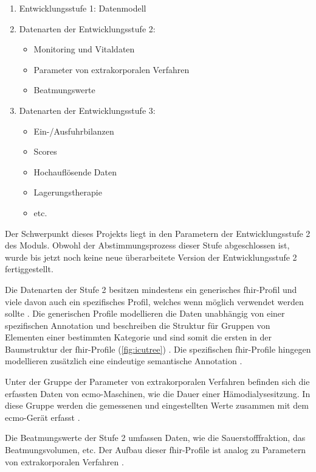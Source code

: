 \begin{enumerate}
	\item Entwicklungsstufe 1: Datenmodell
	\item Datenarten der Entwicklungsstufe 2:
	\begin{itemize}
		\item Monitoring und Vitaldaten
		\item Parameter von extrakorporalen Verfahren
		\item Beatmungswerte
	\end{itemize}
	\item Datenarten der Entwicklungsstufe 3:
	\begin{itemize}
		\item Ein-/Ausfuhrbilanzen
		\item Scores
		\item Hochauflösende Daten
		\item Lagerungstherapie
		\item etc.
	\end{itemize}
\end{enumerate}

 Der Schwerpunkt dieses Projekts liegt in den Parametern der Entwicklungsstufe 2 des Moduls. Obwohl der Abstimmungsprozess dieser Stufe abgeschlossen ist, wurde bis jetzt noch keine neue überarbeitete Version der Entwicklungsstufe 2 fertiggestellt.

 Die Datenarten der Stufe 2 besitzen mindestens ein generisches \ac{fhir}-Profil und viele davon auch ein spezifisches Profil, welches wenn möglich verwendet werden sollte \cite{icukdz, modicuvid}. Die generischen Profile modellieren die Daten unabhängig von einer spezifischen Annotation und beschreiben die Struktur für Gruppen von Elementen einer bestimmten Kategorie und sind somit die ersten in der Baumstruktur der \ac{fhir}-Profile (\ref{fig:icutree}) \cite{icukdz}. Die spezifischen \ac{fhir}-Profile hingegen modellieren zusätzlich eine eindeutige semantische Annotation \cite{modicuvid}.
 
 Unter der Gruppe der Parameter von extrakorporalen Verfahren befinden sich die erfassten Daten von \ac{ecmo}-Maschinen, wie die Dauer einer Hämodialysesitzung. In diese Gruppe werden die gemessenen und eingestellten Werte zusammen mit dem \ac{ecmo}-Gerät erfasst \cite{icukdz}. 
 
 Die Beatmungswerte der Stufe 2 umfassen Daten, wie die Sauerstofffraktion, das Beatmungsvolumen, etc. Der Aufbau dieser \ac{fhir}-Profile ist analog zu Parametern von extrakorporalen Verfahren \cite{icukdz}.

